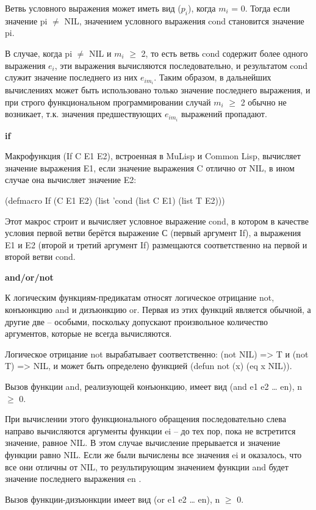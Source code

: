 \documentclass{article}
\begin{document}
Ветвь условного выражения может иметь вид ($p_i$), когда $m_i$ = 0. Тогда если значение pi $\neq$ NIL, значением условного выражения cond становится значение pi.

В случае, когда pi $\neq$ NIL и $m_i$ $\geqslant$ 2, то есть ветвь cond содержит более  одного выражения $e_i$, эти выражения вычисляются последовательно, и  результатом cond служит значение последнего из них $e_{im_i}$. Таким  образом, в дальнейших вычислениях может быть использовано только значение последнего выражения, и при строго функциональном  программировании случай $m_i$ $\geqslant$ 2 обычно не возникает, т.к. значения  предшествующих $e_{im_i}$ выражений пропадают. 


 
\textbf{if}

Макрофункция (If C E1 E2), встроенная в MuLisp и Common Lisp, вычисляет значение выражения E1, если значение выражения C отлично от NIL, в ином случае она вычисляет значение E2:

(defmacro If (C E1 E2) (list 'cond (list C E1) (list T E2)))

Этот макрос строит и вычисляет условное выражение cond, в котором в качестве условия первой ветви берётся выражение С (первый аргумент If), а выражения E1 и E2 (второй и третий аргумент If) размещаются соответственно на первой и второй ветви cond.


\textbf{and/or/not}

К логическим функциям-предикатам относят логическое отрицание not, конъюнкцию and и дизъюнкцию or. Первая из этих функций является обычной, а другие две – особыми, поскольку допускают произвольное количество аргументов, которые не всегда вычисляются. 

Логическое отрицание not вырабатывает соответственно: (not NIL) => T и (not T) => NIL, и может быть определено функцией (defun not (x) (eq x NIL)).


Вызов функции and, реализующей конъюнкцию, имеет вид (and e1 e2 … en), n $\geqslant$ 0. 

При вычислении этого функционального обращения последовательно слева направо вычисляются аргументы функции ei – до тех пор, пока не  встретится значение, равное NIL. В этом случае вычисление прерывается и значение функции равно NIL. Если же были вычислены все значения ei и  оказалось, что все они отличны от NIL, то результирующим значением функции and будет значение последнего выражения en .

Вызов функции-дизъюнкции имеет вид (or e1 e2 … en), n $\geqslant$ 0. 
\end{document}
